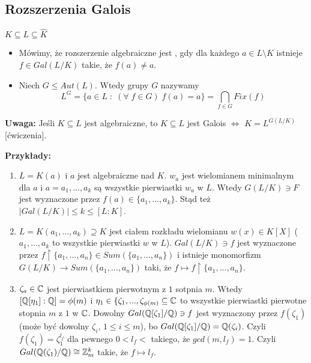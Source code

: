 \subsection{Rozszerzenia Galois}
\begin{bbox}
$K\subseteq L\subseteq\hat{K}$
\begin{itemize}
    \item[\PHtunny] Mówimy, że rozszerzenie algebraiczne jest , gdy dla każdego $a\in L\setminus K$ istnieje $f\in Gal(L/K)$ takie, że $f(a)\neq a$.
    \item[\PHtunny] Niech $G\leq Aut(L)$. Wtedy  grupy $G$ nazywamy 
    $$L^G=\{a\in L\;:\;(\forall\;f\in G)\;f(a)=a\}=\bigcap_{f\in G}Fix(f)$$
\end{itemize}
\end{bbox}

\textbf{Uwaga:} Jeśli $K\subseteq L$ jest algebraiczne, to $K\subseteq L$ jest Galois $\iff$ $K=L^{G(L/K)}$ [ćwiczenia].

\textbf{Przykłady:}
\begin{enumerate}
    \item $L=K(a)$ i $a$ jest algebraiczne nad $K$. $w_a$ jest wielomianem minimalnym dla $a$ i $a=a_1,...,a_k$ są wszystkie pierwiastki $w_a$ w $L$. Wtedy $G(L/K)\ni F$ jest wyznaczone przez $f(a)\in \{a_1,...,a_k\}$. Stąd też $|Gal(L/K)|\leq k\leq [L:K]$.
    \item $L=K(a_1,...,a_k)\supseteq K$ jest ciałem rozkładu wielomianu $w(x)\in K[X]$ ($a_1,...,a_k$ to wszystkie pierwiastki $w$ w $L$). $Gal(L/K)\ni f$ jest wyznaczone przez $f\restriction\{a_1,...,a_n\}\in Sum(\{a_1,...,a_n\})$ i istnieje monomorfizm $G(L/K)\to Sum(\{a_1,...,a_n\})$ taki, że $f\mapsto f\restriction\{a_1,...,a_n\}$.
    \item $\zeta_a\in\mathbb{C}$ jest pierwiastkiem pierwotnym z $1$ sotpnia $m$. Wtedy $[\mathbb{Q}[\eta_1]:\mathbb{Q}]=\phi(m)$ i $\eta_1\in\{\zeta_1,...,\zeta_{\phi(m)}\subseteq\mathbb{C}$ to wszystkie pierwiastki pierwotne stopnia $m$ z $1$ w $\mathbb{C}$. Dowolny $Gal(\mathbb{Q}[\zeta_1]/\mathbb{Q})\ni f$ jest wyznaczony przez $f(\zeta_1)$ (może być dowolny $\zeta_i$, $1\leq i\leq m$), bo $Gal(\mathbb{Q}[\zeta_1]/\mathbb{Q})=\mathbb{Q}(\zeta_i)$. Czyli $f(\zeta_1)=\zeta_1^{l_f}$ dla pewnego $0< l_f<$ takiego, że $gcd(m, l_f)=1$. Czyli $Gal(\mathbb{Q}(\zeta_1)/\mathbb{Q})\cong \mathbb{Z}_m^k$ takie, że $f\mapsto l_f$.
\end{enumerate}


